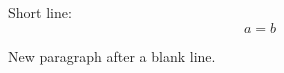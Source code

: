 \documentclass[10pt]{article}
\begin{document}
Short line:
\[ a = b \]

New paragraph after a blank line.
\end{document}
